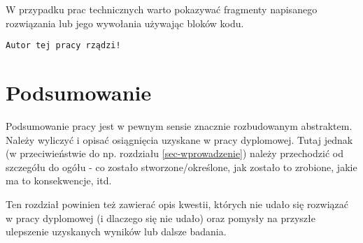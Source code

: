 \documentclass{amuthesis}
\begin{document}
W przypadku prac technicznych warto pokazywać fragmenty napisanego
rozwiązania lub jego wywołania używając bloków kodu.

\begin{Shaded}
\begin{Highlighting}[]
\OtherTok{=} 
  \NormalTok{)}
\NormalTok{\}}
\NormalTok{(}\NormalTok{)}
\end{Highlighting}
\end{Shaded}

\begin{verbatim}
Autor tej pracy rządzi!
\end{verbatim}


\hypertarget{podsumowanie}{%
\chapter{Podsumowanie}\label{podsumowanie}}

Podsumowanie pracy jest w pewnym sensie znacznie rozbudowanym
abstraktem. Należy wyliczyć i opisać osiągnięcia uzyskane w pracy
dyplomowej. Tutaj jednak (w przeciwieństwie do np. rozdziału
\ref{sec-wprowadzenie}) należy przechodzić od szczegółu do ogółu - co
zostało stworzone/określone, jak zostało to zrobione, jakie ma to
konsekwencje, itd.

Ten rozdział powinien też zawierać opis kwestii, których nie udało się
rozwiązać w pracy dyplomowej (i dlaczego się nie udało) oraz pomysły na
przyszłe ulepszenie uzyskanych wyników lub dalsze badania.

\printbibliography[heading=bibintoc, title=Bibliografia]
\end{document}
